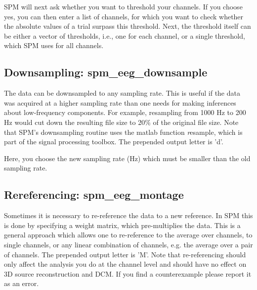 SPM will next ask whether you want to threshold your channels. If you choose yes,
you can then enter a list of channels, for which you want to check whether 
the absolute values of a trial surpass this threshold. Next, the threshold
itself can be either a vector of thresholds, i.e., one for each channel, 
or a single threshold, which SPM uses for all channels.

\subsection{Downsampling: spm\_eeg\_downsample}
The data can be downsampled to any sampling rate. This is useful if
the data was acquired at a higher sampling rate than one needs for 
making inferences about low-frequency components. For example,
resampling from 1000 Hz to 200 Hz would cut down the resulting file
size to 20\% of the original file size. Note that SPM's downsampling
routine uses the matlab function {\textit resample}, which is part of
the signal processing toolbox. The prepended output letter is 'd'.

Here, you choose the new sampling rate (Hz) which must be smaller than the old sampling rate.

\subsection{Rereferencing: spm\_eeg\_montage}
Sometimes it is necessary to re-reference the data to a new
reference. In SPM this is done by specifying a weight matrix, which 
pre-multiplies the data. This is a general approach which 
allows one to re-reference to the average over channels, to single
channels, or any linear combination of channels, e.g. the average over
a pair of channels. The prepended output letter is 'M'. Note that re-referencing
should only affect the analysis you do at the channel level and should have no effect
on 3D source reconstruction and DCM. If you find a counterexample please report
it as an error.

